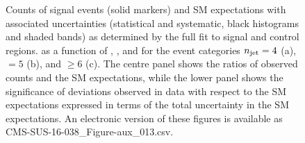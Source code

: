 \begin{figure}
\begin{center}
  \caption{Counts of signal events (solid markers) and SM expectations
    with associated uncertainties (statistical and systematic, black
    histograms and shaded bands) 
    as determined by the full fit to signal and control regions.
    as a function of \nb, \scalht, and \mht for the event categories
    $n_{\text{jet}} = 4$ (a), $=5$ (b), and ${\geq}6$ (c).
    The centre panel shows the ratios of
    observed counts and the SM expectations, while the lower panel
    shows the significance of deviations observed in data with respect
    to the SM expectations expressed in terms of the total uncertainty
    in the SM expectations.
    An electronic version of these figures is available as CMS-SUS-16-038\_Figure-aux\_013.csv.
    }
        \label{fig:T1qqqqLL_full-fit_456}
    \end{center}
\end{figure}

